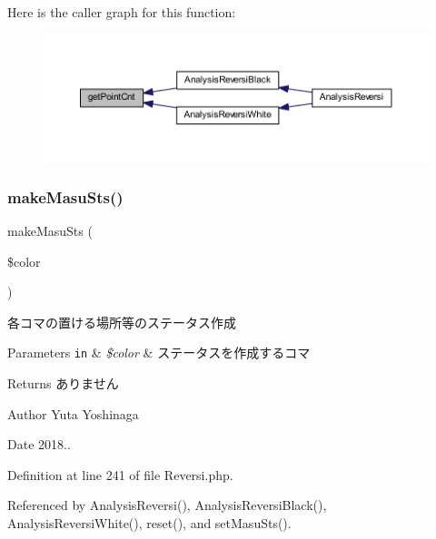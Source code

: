 Here is the caller graph for this function\+:\nopagebreak
\begin{figure}[H]
\begin{center}
\leavevmode
\includegraphics[width=350pt]{class_reversi_af538d04718f177f71461f582f3bd8eba_icgraph}
\end{center}
\end{figure}
\mbox{\label{class_reversi_a88869682786bb7c45c3488113deaa789}} 
\subsubsection{\texorpdfstring{make\+Masu\+Sts()}{makeMasuSts()}}
{\footnotesize\ttfamily make\+Masu\+Sts (\begin{DoxyParamCaption}\item[{}]{\$color }\end{DoxyParamCaption})\hspace{0.3cm}{\ttfamily [private]}}



各コマの置ける場所等のステータス作成 


\begin{DoxyParams}[1]{Parameters}
\mbox{\tt in}  & {\em \$color} & ステータスを作成するコマ \\
\hline
\end{DoxyParams}
\begin{DoxyReturn}{Returns}
ありません 
\end{DoxyReturn}
\begin{DoxyAuthor}{Author}
Yuta Yoshinaga 
\end{DoxyAuthor}
\begin{DoxyDate}{Date}
2018.. 
\end{DoxyDate}


Definition at line 241 of file Reversi.\+php.



Referenced by Analysis\+Reversi(), Analysis\+Reversi\+Black(), Analysis\+Reversi\+White(), reset(), and set\+Masu\+Sts().

